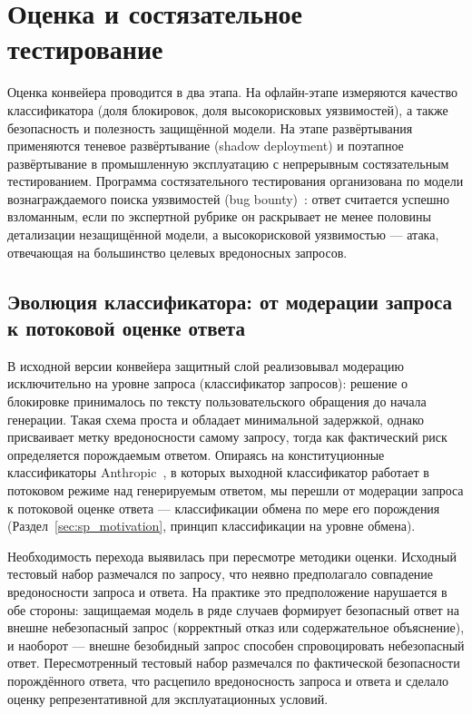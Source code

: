 \section{Оценка и состязательное тестирование}\label{sec:sp_evaluation}

Оценка конвейера проводится в два этапа.
На офлайн-этапе измеряются качество классификатора (доля блокировок, доля высокорисковых уязвимостей), а также безопасность и полезность защищённой модели.
На этапе развёртывания применяются теневое развёртывание (shadow deployment) и поэтапное развёртывание в промышленную эксплуатацию с непрерывным состязательным тестированием.
Программа состязательного тестирования организована по модели вознаграждаемого поиска уязвимостей (bug bounty)~\cite{sharma2025cc,cunningham2026ccpp,ganguli2022redteam}: ответ считается успешно взломанным, если по экспертной рубрике он раскрывает не менее половины детализации незащищённой модели, а высокорисковой уязвимостью --- атака, отвечающая на большинство целевых вредоносных запросов.
\subsection{Эволюция классификатора: от модерации запроса к потоковой оценке ответа}\label{subsec:sp_censor_evolution}

В исходной версии конвейера защитный слой реализовывал модерацию исключительно на уровне запроса (классификатор запросов): решение о блокировке принималось по тексту пользовательского обращения до начала генерации.
Такая схема проста и обладает минимальной задержкой, однако присваивает метку вредоносности самому запросу, тогда как фактический риск определяется порождаемым ответом.
Опираясь на конституционные классификаторы Anthropic~\cite{sharma2025cc,cunningham2026ccpp}, в которых выходной классификатор работает в потоковом режиме над генерируемым ответом, мы перешли от модерации запроса к потоковой оценке ответа --- классификации обмена по мере его порождения (Раздел~\ref{sec:sp_motivation}, принцип классификации на уровне обмена).

Необходимость перехода выявилась при пересмотре методики оценки.
Исходный тестовый набор размечался по запросу, что неявно предполагало совпадение вредоносности запроса и ответа.
На практике это предположение нарушается в обе стороны: защищаемая модель в ряде случаев формирует безопасный ответ на внешне небезопасный запрос (корректный отказ или содержательное объяснение), и наоборот --- внешне безобидный запрос способен спровоцировать небезопасный ответ.
Пересмотренный тестовый набор размечался по фактической безопасности порождённого ответа, что расцепило вредоносность запроса и ответа и сделало оценку репрезентативной для эксплуатационных условий.

